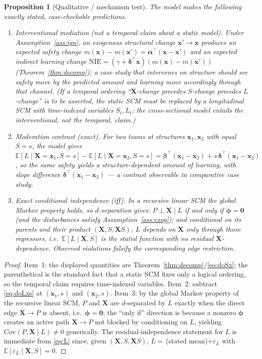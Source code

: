 \documentclass{amsart}
\theoremstyle{definition}
\theoremstyle{plain}
\newtheorem{proposition}{Proposition}
\begin{document}
\begin{proposition}[Qualitative / mechanism test]\label{prop:qual}
The model makes the following \emph{exactly} stated, case-checkable predictions.
\begin{enumerate}
\item \emph{Interventional mediation (not a temporal claim about a static model).} Under
Assumption~\ref{ass:ign}, an exogenous structural change $\bm x'\!\to\!\bm x$ produces an
expected safety change $m(\bm x)-m(\bm x')=\bm\alpha^\top(\bm x-\bm x')$ and an expected
indirect learning change $\mathrm{NIE}=(\gamma+\bm\delta^\top\bm x)(m(\bm x)-m(\bm x'))$
(Theorem~\ref{thm:decomp}); a case study that intervenes on structure should see safety move
by the predicted amount and learning move accordingly through that channel. (If a
\emph{temporal} ordering ``$\bm X$-change precedes $S$-change precedes $L$-change'' is to be
asserted, the static SCM must be replaced by a longitudinal SCM with time-indexed variables
$S_t,L_t$; the cross-sectional model entails the interventional, not the temporal, claim.)
\item \emph{Moderation contrast (exact).} For two teams at structures $\bm x_1,\bm x_2$ with
equal $S=s$, the model gives $\mathbb E[L\mid\bm X=\bm x_1,S=s]-\mathbb E[L\mid\bm X=\bm
x_2,S=s]=\bm\beta^\top(\bm x_1-\bm x_2)+s\,\bm\delta^\top(\bm x_1-\bm x_2)$, so the
\emph{same} safety yields a structure-dependent amount of learning, with slope difference
$\bm\delta^\top(\bm x_1-\bm x_2)$ --- a contrast observable in comparative case study.
\item \emph{Exact conditional independence (iff).} In a recursive linear SCM the global
Markov property holds, so $d$-separation gives: $P\perp\bm X\mid L$ \emph{if and only if}
$\bm\phi=\bm0$ (and the disturbances satisfy Assumption~\ref{ass:exog}); and conditional on
its parents and their product $(\bm X,S,\bm X S)$, $L$ depends on $\bm X$ only through those
regressors, i.e.\ $\mathbb E[L\mid\bm X,S]$ is the stated function with no residual
$\bm X$-dependence. Observed violations falsify the corresponding edge restriction.
\end{enumerate}
\end{proposition}
\begin{proof}
Item~1: the displayed quantities are Theorem~\ref{thm:decomp}/\eqref{eq:doSx}; the
parenthetical is the standard fact that a static SCM fixes only a logical ordering, so the
temporal claim requires time-indexed variables. Item~2: subtract \eqref{eq:doLxs} at
$(\bm x_1,s)$ and $(\bm x_2,s)$. Item~3: by the global Markov property of the recursive
linear SCM, $P$ and $\bm X$ are $d$-separated by $L$ exactly when the direct edge
$\bm X\to P$ is absent, i.e.\ $\bm\phi=\bm0$; the ``only if'' direction is because a nonzero
$\bm\phi$ creates an active path $\bm X\to P$ not blocked by conditioning on $L$, yielding
$\mathrm{Cov}(P,\bm X\mid L)\neq0$ generically. The residual-independence statement for $L$
is immediate from \eqref{eq:L} since, given $(\bm X,S,\bm X S)$, $L=\,$(stated mean)$+
\varepsilon_L$ with $\mathbb E[\varepsilon_L\mid\bm X,S]=0$.
\end{proof}
\end{document}
